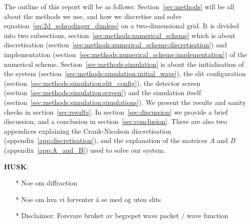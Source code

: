 The outline of this report will be as follows: Section~\ref{sec:methods} will be all about the methods we use, and how we discretise and solve equation~\eqref{eq:2d_schrodinger_dimless} on a two-dimensional grid. It is divided into two subsections, section~\ref{sec:methods:numerical_scheme} which is about discretisation (section~\ref{sec:methods:numerical_scheme:discretisation}) and implementation (section~\ref{sec:methods:numerical_scheme:implementation}) of the numerical scheme. Section~\ref{sec:methods:simulation} is about the initialisation of the system (section~\ref{sec:methods:simulation:initial_wave}), the slit configuration (section~\ref{sec:methods:simulation:slit_config}), the detector screen (section~\ref{sec:methods:simulation:screen}) and the simulation itself (section~\ref{sec:methods:simulation:simulations}). We present the results and sanity checks in section~\ref{sec:results}. In section~\ref{sec:discussion} we provide a brief discussion, and a conclusion in section~\ref{sec:conclusion}. There are also two appendices explaining the Crank-Nicolson discretisation (appendix~\ref{app:discretisation}), and the explanation of the matrices $A$ and $B$ (appendix~\ref{app:A_and_B}) used to solve our system. 



\textbf{HUSK}:
\begin{enumerate}
    \item[*] Noe om diffraction
    \item[*] Noe om hva vi forventer å se med og uten slits
    \item[*] Disclaimer: Forsvare bruket av begrepet wave packet / wave function
\end{enumerate}









